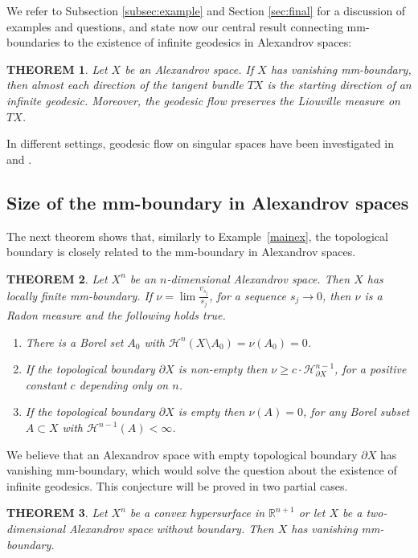 \documentclass[12pt,leqno,intlimits]{amsart}
\numberwithin{equation}{section}
\newtheorem{thm}{THEOREM}[section]
\theoremstyle{definition}
\theoremstyle{remark}
\newcommand{\exref}[1]{Example~\ref{#1}}
\newcommand{\R}{\mathbb{R}}
\begin{document}
We refer to Subsection \ref{subsec:example} and Section \ref{sec:final} for a discussion of examples and questions, and
state now our central result connecting mm-boundaries to the existence of infinite geodesics in Alexandrov spaces:

\begin{thm} \label{thmmain}
Let $X$ be an Alexandrov space.
If $X$ has vanishing mm-boundary, then almost each direction of the tangent
bundle $TX$ is the starting direction of an infinite geodesic. 
Moreover, the geodesic flow preserves the Liouville measure on $TX$.
\end{thm}

In different settings, geodesic flow on singular spaces have been investigated in \cite{BallmannBrin} and \cite{Bamler}.

\subsection{Size of the mm-boundary in Alexandrov spaces}
The next theorem shows that, similarly to \exref{mainex}, the topological boundary is closely related to the mm-boundary in Alexandrov spaces.

\begin{thm} \label{alexandrovthm}
Let $X^n$ be an $n$-dimensional Alexandrov space.
Then $X$ has locally finite mm-boundary.
If $ \nu= \lim \frac{v_{s_j}}{s_j}$, for a sequence $s_j \to 0 $, then $\nu$ is a Radon measure and
the following holds true.
\begin{enumerate}
\item\label{full-measure-zero-nu}There is a Borel set $A_0$ with $\mathcal H^n (X\setminus A_0) = \nu (A_0)=0$.
\item\label{bry-nu} If the topological boundary $\partial X$ is non-empty then $\nu \geq c \cdot \mathcal H^{n-1} _{\partial X}$,
for a positive constant $c$ depending only on $n$.
\item \label{n-1-nu} If the topological boundary $\partial X$ is empty then $\nu (A)=0$, for any Borel subset $A\subset X$ with $\mathcal H^{n-1} (A)<\infty$.
\end{enumerate}
\end{thm}

We believe that an Alexandrov space with empty topological boundary $\partial X$ has vanishing mm-boundary,
which would solve the question about the existence of infinite geodesics.
This conjecture will be proved in two partial cases.

\begin{thm} \label{hypersurface}
Let $X^n$ be a convex hypersurface in $\R^{n+1}$ or let $X$ be a two-dimensional Alexandrov space without boundary. 
Then $X$ has vanishing  mm-boundary.
\end{thm}
\end{document}
